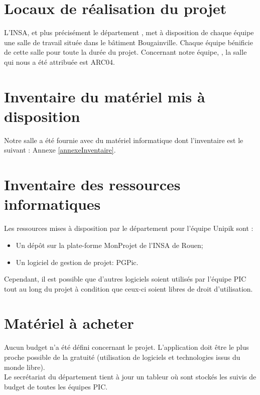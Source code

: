 \section{Locaux de réalisation du projet}
\label{Locaux de réalisation du projet}
\indent L'INSA, et plus précisément le département \ASI{}, met à disposition de chaque équipe une salle de travail située dans le bâtiment Bougainville. Chaque équipe \PIC{} bénificie de cette salle pour toute la durée du projet.
Concernant notre équipe, \nomEquipe, la salle qui nous a été attribuée est ARC04.

\section{Inventaire du matériel mis à disposition}
\label{Inventaire du matériel mis à disposition}
Notre salle \PICCourt a été fournie avec du matériel informatique dont l'inventaire est le suivant : Annexe \ref{annexeInventaire}.

\section{Inventaire des ressources informatiques}
\label{Inventaire des ressources informatiques}
Les ressources mises à disposition par le département \ASI{} pour l'équipe Unipik sont :

\begin{itemize}
	\item Un dépôt \git{} sur la plate-forme MonProjet de l'INSA de Rouen;
	\item Un logiciel de gestion de projet: PGPic.\\
\end{itemize}

Cependant, il est possible que d'autres logiciels soient utilisés par l'équipe PIC tout au long du projet à condition que ceux-ci soient libres de droit d'utilisation.

\section{Matériel à acheter}
\label{Matériel à acheter}
\indent Aucun budget n'a été défini concernant le projet. L'application doit être le plus proche possible de la gratuité (utilisation de logiciels et technologies issus du monde libre). \\
\indent Le secrétariat du département tient à jour un tableur où sont stockés les suivis de budget de toutes les équipes PIC.

